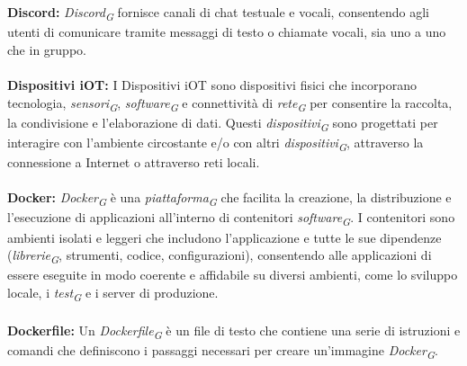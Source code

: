 \documentclass{article}
\begin{document}
\\
\\
\textbf{Discord:} \textit{Discord}\textsubscript{\textit{G}} fornisce canali di chat testuale e vocali, consentendo agli utenti di comunicare tramite messaggi di testo o chiamate vocali, sia uno a uno che in gruppo.
\\
\\
\textbf{Dispositivi iOT:} I Dispositivi iOT sono dispositivi fisici che incorporano tecnologia, \textit{sensori}\textsubscript{\textit{G}}, \textit{software}\textsubscript{\textit{G}} e connettività di \textit{rete}\textsubscript{\textit{G}} per consentire la raccolta, la condivisione e l'elaborazione di dati. Questi \textit{dispositivi}\textsubscript{\textit{G}} sono progettati per interagire con l'ambiente circostante e/o con altri \textit{dispositivi}\textsubscript{\textit{G}}, attraverso la connessione a Internet o attraverso reti locali.
\\
\\
\textbf{Docker:} \textit{Docker}\textsubscript{\textit{G}} è una \textit{piattaforma}\textsubscript{\textit{G}} che facilita la creazione, la distribuzione e l'esecuzione di applicazioni all'interno di contenitori \textit{software}\textsubscript{\textit{G}}. I contenitori sono ambienti isolati e leggeri che includono l'applicazione e tutte le sue dipendenze (\textit{librerie}\textsubscript{\textit{G}}, strumenti, codice, configurazioni), consentendo alle applicazioni di essere eseguite in modo coerente e affidabile su diversi ambienti, come lo sviluppo locale, i \textit{test}\textsubscript{\textit{G}} e i server di produzione.
\\
\\
\textbf{Dockerfile:} Un \textit{Dockerfile}\textsubscript{\textit{G}} è un file di testo che contiene una serie di istruzioni e comandi che definiscono i passaggi necessari per creare un'immagine \textit{Docker}\textsubscript{\textit{G}}.
\\
\\
\pagebreak
\end{document}
